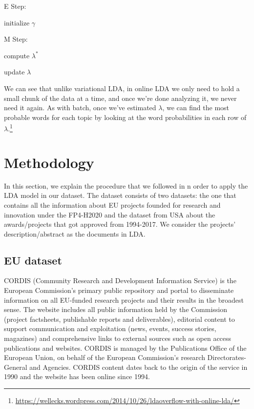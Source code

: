 \documentclass[12pt]{report}
\begin{document}
\begin{algorithm}
\SetAlgoNoLine
E Step:

initialize $\gamma$

M Step:

compute $\lambda^{*}$

update $\lambda$
\end{algorithm}

We can see that unlike variational LDA, in online LDA we only need to hold a
small chunk of the data at a time, and once we’re done analyzing it, we never
need it again. As with batch, once we’ve estimated $\lambda$, we can find the 
most probable words for each topic by looking at the word probabilities in 
each row of $\lambda$.\footnote{\url{https://wellecks.wordpress.com/2014/10/26/ldaoverflow-with-online-lda/}}

\section{Methodology}

In this section, we explain the procedure that we followed in n order to apply the LDA model in our dataset. The dataset consists of two datasets: the one that contains all the information about EU projects founded for research and innovation under the FP4-H2020 and the dataset from USA about the awards/projects that got approved from 1994-2017. We consider the projects' description/abstract as the documents in LDA.
 

\subsection{EU dataset}

CORDIS (Community Research and Development Information Service) is the European Commission's primary public repository and portal to disseminate information on all EU-funded research projects and their results in the broadest sense. The website includes all public information held by the Commission (project factsheets, publishable reports and deliverables), editorial content to support communication and exploitation (news, events, success stories, magazines) and comprehensive links to external sources such as open access publications and websites. CORDIS is managed by the Publications Office of the European Union, on behalf of the European Commission's research Directorates-General and Agencies. CORDIS content dates back to the origin of the service in 1990 and the website has been online since 1994.
\end{document}
